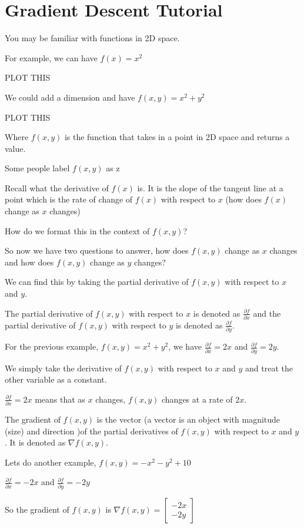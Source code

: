 \documentclass{article}
\author{David Saldubehere}
\begin{document}
\section{Gradient Descent Tutorial}
You may be familiar with functions in 2D space.

For example, we can have $f(x) = x^2$

PLOT THIS

We could add a dimension and have $f(x, y) = x^2 + y^2$

PLOT THIS

Where $f(x, y)$ is the function that takes in a point in 2D space and returns a value.

Some people label $f(x, y)$ as z

Recall what the derivative of $f(x)$ is. It is the slope of the tangent line at a point which is the rate of change of $f(x)$ with respect to $x$ (how does $f(x)$ change as $x$ changes) 

How do we format this in the context of $f(x, y)$?

So now we have two questions to answer, how does $f(x, y)$ change as $x$ changes and how does $f(x, y)$ change as $y$ changes?

We can find this by taking the partial derivative of $f(x, y)$ with respect to $x$ and $y$.

The partial derivative of $f(x, y)$ with respect to $x$ is denoted as $\frac{\partial f}{\partial x}$ and the partial derivative of $f(x, y)$ with respect to $y$ is denoted as $\frac{\partial f}{\partial y}$.

For the previous example, $f(x, y) = x^2 + y^2$, we have $\frac{\partial f}{\partial x} = 2x$ and $\frac{\partial f}{\partial y} = 2y$.

We simply take the derivative of $f(x, y)$ with respect to $x$ and $y$ and treat the other variable as a constant.

$\frac{\partial f}{\partial x} = 2x$ means that as $x$ changes, $f(x, y)$ changes at a rate of $2x$.

The gradient of $f(x, y)$ is the vector (a vector is an object with magnitude (size) and direction )of the partial derivatives of $f(x, y)$ with respect to $x$ and $y$. It is denoted as $\nabla f(x, y)$.

Lets do another example, $f(x, y) = -x^2 -y^2 + 10$

$\frac{\partial f}{\partial x} = -2x$ and $\frac{\partial f}{\partial y} = -2y$

So the gradient of $f(x, y)$ is $\nabla f(x, y) = \begin{bmatrix} -2x \\ -2y \end{bmatrix}$
\end{document}
